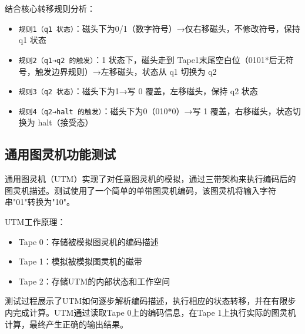 \documentclass{sysucseexp}
\begin{document}
结合核心转移规则分析：
\begin{itemize}
    \item \texttt{规则1（q1 状态）}：磁头下为0/1（数字符号）→仅右移磁头，不修改符号，保持 q1 状态
    \item \texttt{规则2（q1→q2 的触发）}：1 状态下，磁头走到 Tape1末尾空白位（0101*后无符号，触发边界规则）→左移磁头，状态从 q1 切换为 q2
    \item \texttt{规则3（q2 状态）}：磁头下为1→写 0 覆盖，左移磁头，保持 q2 状态
    \item \texttt{规则4（q2→halt 的触发）}：磁头下为0（010*0）→写 1 覆盖，右移磁头，状态切换为 halt（接受态）
\end{itemize}

\subsection{通用图灵机功能测试}

通用图灵机（UTM）实现了对任意图灵机的模拟，通过三带架构来执行编码后的图灵机描述。测试使用了一个简单的单带图灵机编码，该图灵机将输入字符串"01"转换为"10"。

UTM工作原理：
\begin{itemize}
    \item Tape 0：存储被模拟图灵机的编码描述
    \item Tape 1：模拟被模拟图灵机的磁带
    \item Tape 2：存储UTM的内部状态和工作空间
\end{itemize}

测试过程展示了UTM如何逐步解析编码描述，执行相应的状态转移，并在有限步内完成计算。UTM通过读取Tape 0上的编码信息，在Tape 1上执行实际的图灵机计算，最终产生正确的输出结果。
\end{document}

